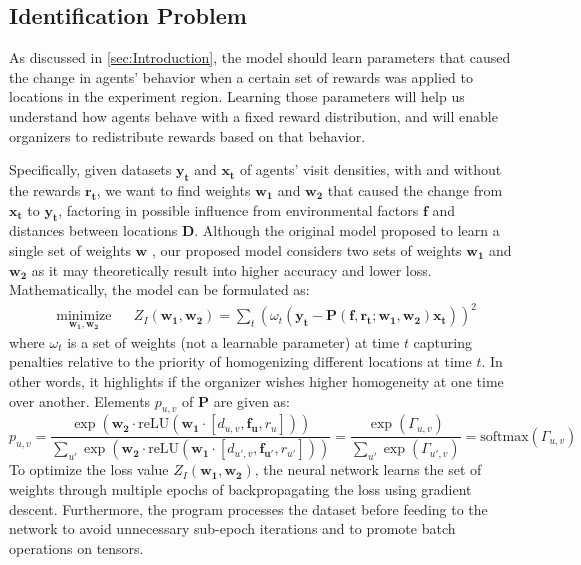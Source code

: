 \documentclass[12pt]{article}
\newcommand{\vect}[1]{\mathbf{#1}}  %
\newcommand{\matr}[1]{\mathbf{#1}}  %
\begin{document}
    \subsection{Identification Problem} \label{sec:Identification Problem}
    As discussed in \cref{sec:Introduction}, the model should learn parameters that caused the change in agents' behavior when a certain set of rewards was applied to locations in the experiment region. Learning those parameters will help us understand how agents behave with a fixed reward distribution, and will enable organizers to redistribute rewards based on that behavior.
    
    Specifically, given datasets $\vect{y_t}$ and $\vect{x_t}$ of agents' visit densities, with and without the rewards $\vect{r_t}$, we want to find weights $\matr{w_1}$ and $\matr{w_2}$ that caused the change from $\vect{x_t}$ to $\vect{y_t}$, factoring in possible influence from environmental factors $\matr{f}$ and distances between locations $\matr{D}$. Although the original model proposed to learn a single set of weights $\matr{w}$ \cite{Xue2016Avi2}, our proposed model considers two sets of weights $\matr{w_1}$ and $\matr{w_2}$ as it may theoretically result into higher accuracy and lower loss. Mathematically, the model can be formulated as:
    \begin{equation} \label{eq:iden_problem}
        \begin{aligned}
            & \underset{\matr{w_1}, \matr{w_2}}{\text{minimize}}
            & & Z_I(\matr{w_1}, \matr{w_2}) = \sum_{t} (\omega_t(\vect{y_t} - \matr{P}(\matr{f}, \vect{r_t}; \matr{w_1}, \matr{w_2})\vect{x_t}))^{2}
        \end{aligned}
    \end{equation}
    where $\omega_t$ is a set of weights (not a learnable parameter) at time $t$ capturing penalties relative to the priority of homogenizing different locations at time $t$. In other words, it highlights if the organizer wishes higher homogeneity at one time over another. Elements $p_{u, v}$ of $\matr{P}$ are given as:
    \begin{equation} \label{eq:puv_equation}
    p_{u, v} = \frac{\exp(\matr{w_2} \cdot \text{reLU} (\matr{w_1} \cdot [d_{u, v}, \vect{f_{u}}, r_{u}]))}{\sum_{u'} \exp(\matr{w_2} \cdot \text{reLU} (\matr{w_1} \cdot [d_{u', v}, \vect{f_{u'}}, r_{u'}]))} = \frac{\exp(\Gamma_{u, v})}{\sum_{u'}\exp(\Gamma_{u', v})} = \text{softmax}(\Gamma_{u, v})
    \end{equation}
    To optimize the loss value $Z_I(\matr{w_1}, \matr{w_2})$, the neural network learns the set of weights through multiple epochs of backpropagating the loss using gradient descent. Furthermore, the program processes the dataset before feeding to the network to avoid unnecessary sub-epoch iterations and to promote batch operations on tensors. 
    
\end{document}
